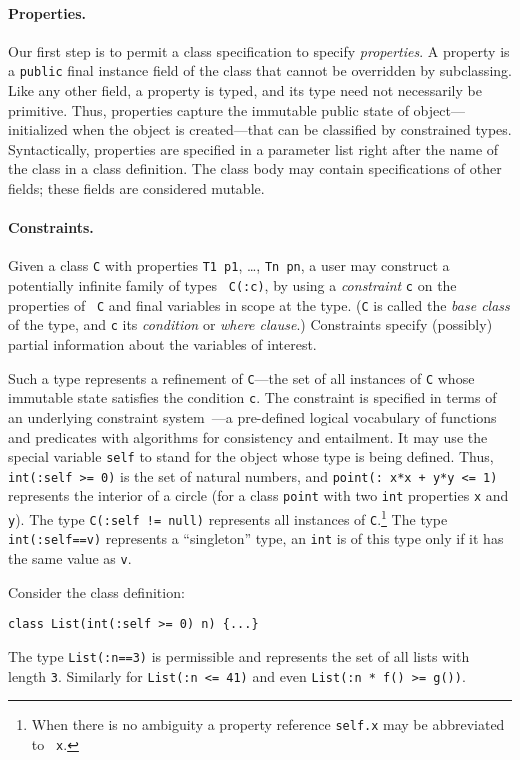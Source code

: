\paragraph{Properties.}
Our first step is to permit a class specification to specify {\em
properties}. A property is a {\tt public} final instance field of the
class that cannot be overridden by subclassing. Like any other field,
a property is typed, and its type need not necessarily be
primitive. Thus, properties capture the immutable public state of
object---initialized when the object is created---that can be
classified by constrained types. Syntactically, properties are
specified in a parameter list right after the name of the class in a
class definition. The class body may contain specifications of other
fields; these fields are considered mutable.

\paragraph{Constraints.}
Given a class {\tt C} with properties {\tt T1 p1}, \ldots, {\tt Tn
pn}, a user may construct a potentially infinite family of types {\tt
C(:c)}, by using a {\em constraint} {\tt c} on the properties of {\tt
C} and final variables in scope at the type. ({\tt C} is called the
{\em base class} of the type, and {\tt c} its {\em condition} or {\em where
clause}.)  Constraints specify (possibly) partial information about the
variables of interest. 

Such a type represents a refinement of {\tt C}---the set of all
instances of {\tt C} whose immutable state satisfies the condition
{\tt c}.  The constraint is specified in terms of an underlying
constraint system~\cite{CCCC}---a pre-defined logical vocabulary of
functions and predicates with algorithms for consistency and
entailment.  It may use the special variable {\tt self} to stand for
the object whose type is being defined. Thus, {\tt int(:self >= 0)} is
the set of natural numbers, and {\tt point(: x*x + y*y <= 1)}
represents the interior of a circle (for a class {\tt point} with two
{\tt int} properties {\tt x} and {\tt y}). The type {\tt C(:self !=
null)} represents all instances of {\tt C}.\footnote{When there is no
ambiguity a property reference {\tt self.x} may be abbreviated to {\tt
x}.} The type {\tt int(:self==v)} represents a ``singleton'' type, an
{\tt int} is of this type only if it has the same value as {\tt v}.

\begin{example}	
Consider the class definition:
{\footnotesize
\begin{verbatim}
class List(int(:self >= 0) n) {...}
\end{verbatim}}
The type {\tt List(:n==3)} is permissible and represents the set of
all lists with length {\tt 3}. Similarly for {\tt List(:n <= 41)}
and even {\tt List(:n * f() >= g())}.
\end{example}

